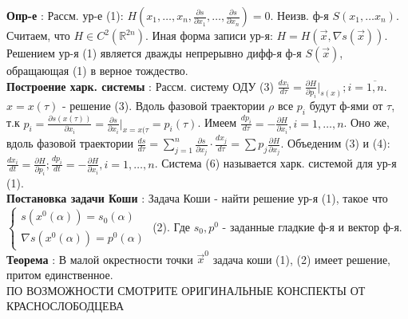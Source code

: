 \documentclass[unicode, 8pt, a4paper,oneside, landscape]{article}
\begin{document}
\begin{multicols}{4}
{\bf Опр-е} : Рассм. ур-е (1): $H(x_1, \ldots, x_n, \frac{\partial s}{\partial x_1}, \ldots, \frac{\partial s}{\partial x_n}) = 0$. Неизв. ф-я $S(x_1, \ldots x_n)$. Считаем, что $H \in C^2(\mathbb{R}^{2n})$. Иная форма записи ур-я: $H = H(\vec{x}, \nabla s(\vec{x}))$. Решением ур-я (1) является дважды непрерывно дифф-я ф-я $S(\vec{x})$, обращающая (1) в верное тождество.\\
{\bf Построение харк. системы} : Рассм. систему ОДУ (3) $\frac{dx_i}{d\tau} = \frac{\partial H}{\partial p_i}|_{s(x)}; i = \overline{1,n}$. $x = x(\tau)$ - решение (3). Вдоль фазовой траектории $\rho$ все $p_i$ будут ф-ями от $\tau$, т.к $p_i = \frac{\partial s(x(\tau))}{\partial x_i} = \frac{\partial s}{\partial x_i}|_{x=x(\tau} = p_i(\tau)$. Имеем $\frac{dp_i}{d\tau} = -\frac{\partial H}{\partial x_i}, i = 1, \ldots, n$. Оно же, вдоль фазовой траектории $\frac{ds}{d\tau} = \sum_{j=1}^n \frac{\partial s}{\partial x_j} \cdot \frac{dx_j}{d\tau} = \sum p_j\frac{\partial H}{\partial x_j}$. Объеденим (3) и (4): $\frac{dx_i}{dt} = \frac{\partial H}{\partial p_i}; \frac{dp_i}{dt} = -\frac{\partial H}{\partial x_i}, i = 1,\ldots,n$. Система (6) называется харк. системой для ур-я (1).\\
{\bf Постановка задачи Коши} : Задача Коши - найти решение ур-я (1), такое что $\begin{cases} s(x^0(\alpha)) = s_0(\alpha) \\ \nabla s(x^0(\alpha)) = p^0(\alpha) \end{cases}$ (2). Где $s_0, p^0$ - заданные гладкие ф-я и вектор ф-я.\\
{\bf Теорема} : В малой окрестности точки $\vec{x}^0$ задача коши (1), (2) имеет решение, притом единственное.\\ ПО ВОЗМОЖНОСТИ СМОТРИТЕ ОРИГИНАЛЬНЫЕ КОНСПЕКТЫ ОТ КРАСНОСЛОБОДЦЕВА\\

\end{multicols}	
\end{document}
